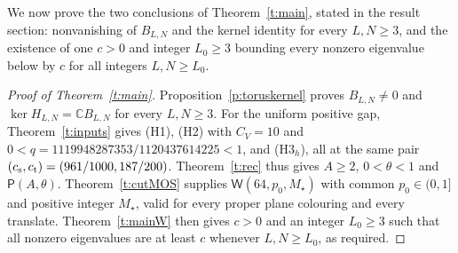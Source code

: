 We now prove the two conclusions of Theorem~\ref{t:main}, stated in
the result section: nonvanishing of \(B_{L,N}\) and the kernel
identity for every \(L,N\ge3\), and the existence of one
\(c>0\) and integer \(L_0\ge3\) bounding every nonzero eigenvalue
below by \(c\) for all integers \(L,N\ge L_0\).

\begin{proof}[Proof of Theorem~\ref{t:main}]
Proposition~\ref{p:toruskernel} proves \(B_{L,N}\ne0\) and
\(\ker H_{L,N}=\mathbb C B_{L,N}\) for every \(L,N\ge3\).
For the uniform positive gap, Theorem~\ref{t:inputs} gives (H1),
(H2) with \(C_V=10\) and
\(0<q=1119948287353/1120437614225<1\), and (H3\(_h\)), all at
the same pair \((c_{\rm s},c_{\rm t})=(961/1000,187/200)\).
Theorem~\ref{t:rec} thus gives \(A\ge2\), \(0<\theta<1\) and
\(\mathsf P(A,\theta)\).
Theorem~\ref{t:cutMOS} supplies
\(\mathsf W(64,p_0,M_\star)\) with common
\(p_0\in(0,1]\) and positive integer \(M_\star\), valid for
every proper plane colouring and every translate.
Theorem~\ref{t:mainW} then gives \(c>0\) and an integer
\(L_0\ge3\) such that all nonzero eigenvalues are at least \(c\)
whenever \(L,N\ge L_0\), as required.
\end{proof}
